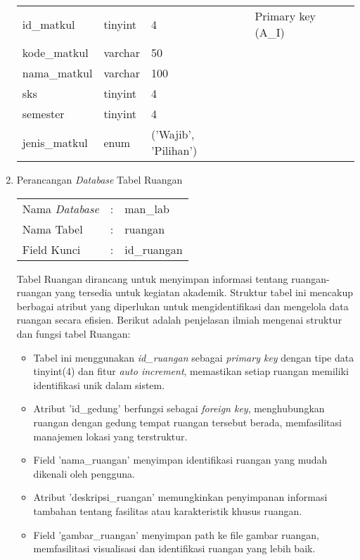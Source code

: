 \begin{enumerate}
{\begin{longtable}{l l l l}
				      id\_matkul              & tinyint                & 4                        & Primary key (A\_I)                \\
				      kode\_matkul            & varchar                & 50                       &                                   \\
				      nama\_matkul            & varchar                & 100                      &                                   \\
				      sks                     & tinyint                & 4                        &                                   \\
				      semester                & tinyint                & 4                        &                                   \\
				      jenis\_matkul           & enum                   & ('Wajib', 'Pilihan')     &                                   \\
				      \hline
			      \end{longtable}
		      }

	\item Perancangan \textit{Database} Tabel Ruangan \\
	      \begin{tabular}{lll}
		      Nama \textit{Database} & : & man\_lab    \\
		      Nama Tabel             & : & ruangan     \\
		      Field Kunci            & : & id\_ruangan \\
	      \end{tabular}

	      Tabel Ruangan dirancang untuk menyimpan informasi tentang ruangan-ruangan yang tersedia untuk kegiatan akademik. Struktur tabel ini mencakup berbagai atribut yang diperlukan untuk mengidentifikasi dan mengelola data ruangan secara efisien. Berikut adalah penjelasan ilmiah mengenai struktur dan fungsi tabel Ruangan:

	      \begin{itemize}
		      \item Tabel ini menggunakan \textit{id\_ruangan} sebagai \textit{primary key} dengan tipe data tinyint(4) dan fitur \textit{auto increment}, memastikan setiap ruangan memiliki identifikasi unik dalam sistem.
		      \item Atribut 'id\_gedung' berfungsi sebagai \textit{foreign key}, menghubungkan ruangan dengan gedung tempat ruangan tersebut berada, memfasilitasi manajemen lokasi yang terstruktur.
		      \item Field 'nama\_ruangan' menyimpan identifikasi ruangan yang mudah dikenali oleh pengguna.
		      \item Atribut 'deskripsi\_ruangan' memungkinkan penyimpanan informasi tambahan tentang fasilitas atau karakteristik khusus ruangan.
		      \item Field 'gambar\_ruangan' menyimpan path ke file gambar ruangan, memfasilitasi visualisasi dan identifikasi ruangan yang lebih baik.
	      \end{itemize}


\end{enumerate}
